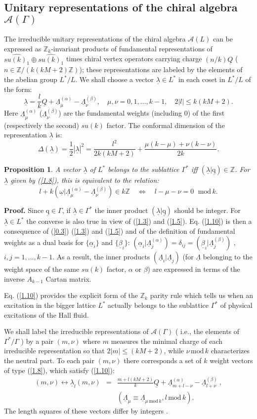 \documentclass[a4paper,12pt]{article}
\newcommand{\beq}{\begin{equation}}
\newcommand{\eeq}{\end{equation}}
\newcommand{\beqa}{\begin{eqnarray}}
\newcommand{\eeqa}{\end{eqnarray}}
\newcommand{\nn}{\nonumber \\}
\newtheorem{prop}[thm]{Proposition}
\def \a {\underline{\alpha}}
\def \l {\underline{\lambda}}
\def \L {\underline{\Lambda}}
\def \La {\underline{\Lambda}^{(\alpha)}}
\def \Lb {\underline{\Lambda}^{(\beta)} }
\def \Q {\underline{Q}}
\def \q {\underline{\mathrm{q}}}
\def \h {\frac{1}{2}}
\def \b {\underline{\beta}}
\def \A {{\mathcal A} }
\def \d {\delta}
\def \D {\Delta}
\def \o {\underline{\omega}}
\def \Z {{\mathbb Z}}
\def \G   {\Gamma}
\def \mod {\, \mathrm{mod}\, }
\begin{document}

\subsection{Unitary representations of the chiral algebra $\A(\G)$ }

The irreducible unitary representations of the
chiral algebra $\A(L)$ can be expressed as
$\Z_k$-invariant products of fundamental representations of
$\widehat{su(k)_1}\oplus \widehat{su(k)_1}$  times chiral vertex
operators carrying charge $(n/k)\Q$ ($n\in\Z/(k(kM+2)\Z)$);
these representations are labeled by the elements of the abelian group
$L^*/L$. We shall choose a vector $\l\in L^*$ in each coset in $L^*/L$
of the form:
\beq\label{1.8}
\l=\frac{l}{k}\Q +\L_\mu^{(\alpha)} -\L_\nu^{(\beta)},
\quad \mu,\nu=0,1,\ldots, k-1, \quad 2|l|\leq k(kM+2).
\eeq
Here  $\L_\mu^{(\alpha)} $ ($\L_\nu^{(\beta)}$) are the fundamental
weights (including 0) of the first (respectively the second) $su(k)$
factor. The conformal dimension of the representation $\l$ is:
\beq\label{1.9}
\D(\l)=\h |\l|^2 = \frac{l^2}{2k(kM+2)} + \frac{\mu(k-\mu)+\nu(k-\nu)}{2k}.
\eeq
\begin{prop}
A vector $\l$ of $L^*$ belongs to the sublattice $\G^*$ iff
$(\l|\q)\in \Z$. For $\l$ given by (\ref{1.8}), this is equivalent
to the relation:
\beq\label{1.10}
l+k(\o|\L_\mu^{(\alpha)}-\L_\nu^{(\beta)}) \in k\Z \quad \Leftrightarrow
\quad l-\mu-\nu=0 \ \ \mod k.
\eeq
\end{prop}
{\bf Proof.}
Since $\q\in \G$, if $\l\in\G^*$ the inner product $(\l|\q)$ should be
integer. For $\l\in L^*$ the converse is also true in view of (\ref{1.3}) and
(\ref{1.5}). Eq. (\ref{1.10}) is then a consequence of (\ref{0.3})
(\ref{1.3}) and (\ref{1.5}) and of the definition of fundamental weights
as a dual basis for $ \{ \a_i \} $ and $ \{ \b_i \} $:
$(\a_i|\L_j^{(\alpha)})=\d_{ij} =(\b_i|\L_j^{(\beta)})$ ,
$ i,j=1,\ldots,k-1$.
As a result, the inner products $(\L_i|\L_j)$ (for $\L$ belonging
to the weight space of the same $su(k)$ factor, $\alpha$ or $\beta$)
are expressed in terms of the inverse $A_{k-1}$ Cartan matrix.

Eq. (\ref{1.10}) provides the explicit form of the $\Z_k$ parity rule which
tells us when an excitation in the bigger lattice $L^*$ actually
belongs to the sublattice $\G^*$ of physical excitations of the 
Hall fluid.

We shall label the irreducible representations
 of $\A(\G )$  ( i.e., the elements
of $\G^* /\G$ )  by a pair $(m,\nu)$ where $m$ measures the minimal
charge of each irreducible representation 
so that $2|m| \leq (kM + 2) $, while $\nu \mod k$
characterizes the neutral part. To each pair $(m,\nu)$
there corresponds a set of $k$ weight vectors of type (\ref{1.8}), which
satisfy (\ref{1.10}):
\beqa\label{2.13}
(m,\nu) \leftrightarrow \l_l(m,\nu) &=& \frac{m + l(kM+ 2)}{k}\Q
+ \La_{m + l - \nu} - \Lb_{l+\nu} \  ,\nn
&& (\L_\mu \equiv \L_{\mu \mod  k},  l \mod k).
 \eeqa
The length squares of these vectors differ by integers \cite{cgt2}.
\end{document}
